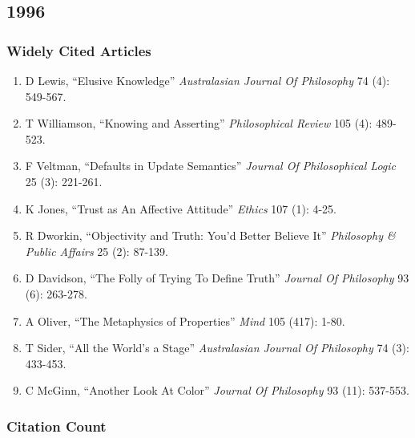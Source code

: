 \documentclass[
  10pt,
  letterpaper,
  DIV=11,
  numbers=noendperiod,
  twoside]{scrartcl}
\providecommand{\tightlist}{%
  \setlength{\itemsep}{0pt}\setlength{\parskip}{0pt}}\usepackage{longtable,booktabs,array}
\begin{document}
\newpage

\subsection{1996}\label{section-20}

\subsubsection*{Widely Cited Articles}\label{widely-cited-articles-20}

\begin{enumerate}
\def\labelenumi{\arabic{enumi}.}
\tightlist
\item
  D Lewis, ``Elusive Knowledge'' \emph{Australasian Journal Of
  Philosophy} 74 (4): 549-567.
\item
  T Williamson, ``Knowing and Asserting'' \emph{Philosophical Review}
  105 (4): 489-523.
\item
  F Veltman, ``Defaults in Update Semantics'' \emph{Journal Of
  Philosophical Logic} 25 (3): 221-261.
\item
  K Jones, ``Trust as An Affective Attitude'' \emph{Ethics} 107 (1):
  4-25.
\item
  R Dworkin, ``Objectivity and Truth: You'd Better Believe It''
  \emph{Philosophy \& Public Affairs} 25 (2): 87-139.
\item
  D Davidson, ``The Folly of Trying To Define Truth'' \emph{Journal Of
  Philosophy} 93 (6): 263-278.
\item
  A Oliver, ``The Metaphysics of Properties'' \emph{Mind} 105 (417):
  1-80.
\item
  T Sider, ``All the World's a Stage'' \emph{Australasian Journal Of
  Philosophy} 74 (3): 433-453.
\item
  C McGinn, ``Another Look At Color'' \emph{Journal Of Philosophy} 93
  (11): 537-553.
\end{enumerate}

\subsubsection*{Citation Count}\label{citation-count-20}
\end{document}
